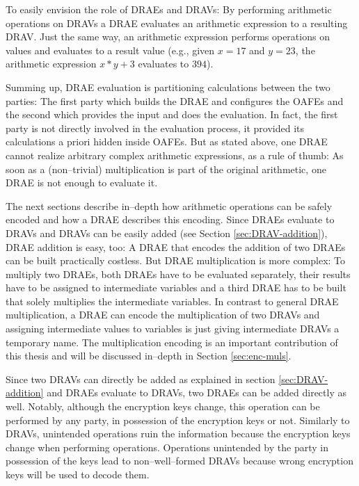 To easily envision the role of DRAEs and DRAVs: By performing arithmetic
operations on DRAVs a DRAE evaluates an arithmetic expression to a resulting
DRAV\@. Just the same way, an arithmetic expression performs operations on
values and evaluates to a result value (e.g., given $x=17$ and $y=23$, the
arithmetic expression $x*y + 3$ evaluates to $394$).

Summing up, DRAE evaluation is partitioning calculations between the two
parties: The first party which builds the DRAE and configures the OAFEs and the
second which provides the input and does the evaluation. In fact, the first
party is not directly involved in the evaluation process, it provided its
calculations a priori hidden inside OAFEs. But as stated above, one DRAE cannot
realize arbitrary complex arithmetic expressions, as a rule of thumb: As soon as
a (non--trivial) multiplication is part of the original arithmetic, one DRAE is
not enough to evaluate it.

The next sections describe in--depth how arithmetic operations can be safely
encoded and how a DRAE describes this encoding. Since DRAEs evaluate to DRAVs
and DRAVs can be easily added (see Section \ref{sec:DRAV-addition}), DRAE
addition is easy, too: A DRAE that encodes the addition of two DRAEs can be
built practically costless. But DRAE multiplication is more complex: To multiply
two DRAEs, both DRAEs have to be evaluated separately, their results have to be
assigned to intermediate variables and a third DRAE has to be built that solely
multiplies the intermediate variables. In contrast to general DRAE
multiplication, a DRAE can encode the multiplication of two DRAVs and assigning
intermediate values to variables is just giving intermediate DRAVs a temporary
name. The multiplication encoding is an important contribution of this thesis
and will be discussed in--depth in Section \ref{sec:enc-muls}.


\label{sec:enc-adds}

Since two DRAVs can directly be added as explained in section
\ref{sec:DRAV-addition} and DRAEs evaluate to DRAVs, two DRAEs can be added
directly as well. Notably, although the encryption keys change, this operation
can be performed by any party, in possession of the encryption keys or not.
Similarly to DRAVs, unintended operations ruin the information because the
encryption keys change when performing operations. Operations unintended by the
party in possession of the keys lead to non--well--formed DRAVs because wrong
encryption keys will be used to decode them.


